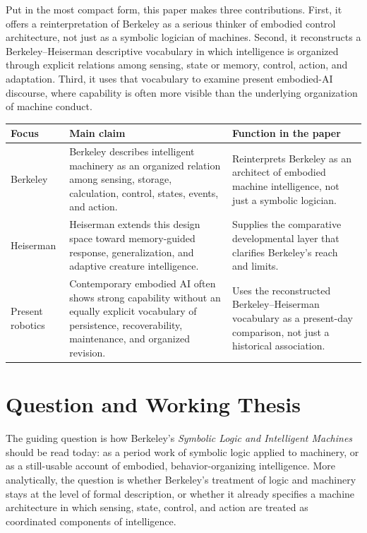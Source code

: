 \documentclass[11pt]{article}
\begin{document}
Put in the most compact form, this paper makes three contributions. First, it offers a reinterpretation of Berkeley as a serious thinker of embodied control architecture, not just as a symbolic logician of machines. Second, it reconstructs a Berkeley--Heiserman descriptive vocabulary in which intelligence is organized through explicit relations among sensing, state or memory, control, action, and adaptation. Third, it uses that vocabulary to examine present embodied-AI discourse, where capability is often more visible than the underlying organization of machine conduct.

\begin{center}
\small
\setlength{\tabcolsep}{5pt}
\begin{tabularx}{\textwidth}{@{}>{\raggedright\arraybackslash}p{}>{\raggedright\arraybackslash}X>{\raggedright\arraybackslash}X@{}}
\hline
Focus & Main claim & Function in the paper \\
\hline
Berkeley & Berkeley describes intelligent machinery as an organized relation among sensing, storage, calculation, control, states, events, and action. & Reinterprets Berkeley as an architect of embodied machine intelligence, not just a symbolic logician. \\
Heiserman & Heiserman extends this design space toward memory-guided response, generalization, and adaptive creature intelligence. & Supplies the comparative developmental layer that clarifies Berkeley's reach and limits. \\
Present robotics & Contemporary embodied AI often shows strong capability without an equally explicit vocabulary of persistence, recoverability, maintenance, and organized revision. & Uses the reconstructed Berkeley--Heiserman vocabulary as a present-day comparison, not just a historical association. \\
\hline
\end{tabularx}
\end{center}

\section{Question and Working Thesis}

The guiding question is how Berkeley's \emph{Symbolic Logic and Intelligent Machines} should be read today: as a period work of symbolic logic applied to machinery, or as a still-usable account of embodied, behavior-organizing intelligence. More analytically, the question is whether Berkeley's treatment of logic and machinery stays at the level of formal description, or whether it already specifies a machine architecture in which sensing, state, control, and action are treated as coordinated components of intelligence.
\end{document}
